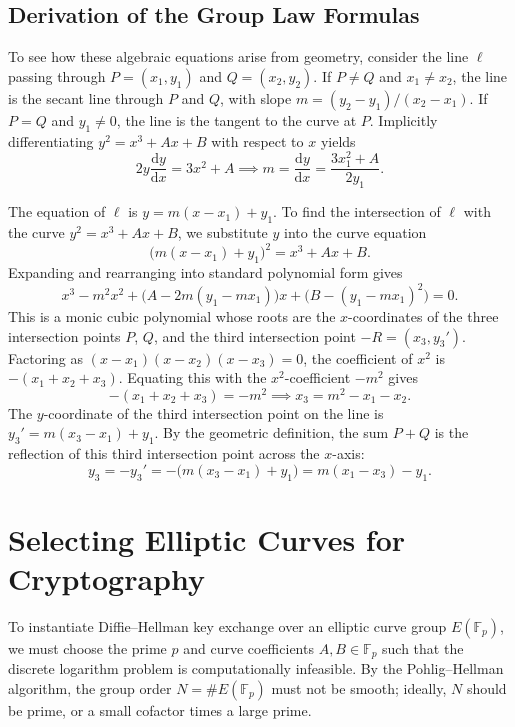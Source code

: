 \subsection*{Derivation of the Group Law Formulas}

To see how these algebraic equations arise from geometry, consider the line \(\ell\) passing through \(P = (x_1, y_1)\) and \(Q = (x_2, y_2)\).
If \(P \neq Q\) and \(x_1 \neq x_2\), the line is the secant line through \(P\) and \(Q\), with slope \(m = (y_2 - y_1) / (x_2 - x_1)\).
If \(P = Q\) and \(y_1 \neq 0\), the line is the tangent to the curve at \(P\).
Implicitly differentiating \(y^2 = x^3 + Ax + B\) with respect to \(x\) yields
\[
    2y \frac{\mathrm{d}y}{\mathrm{d}x} = 3x^2 + A \implies m = \frac{\mathrm{d}y}{\mathrm{d}x} = \frac{3x_1^2 + A}{2y_1}.
\]

The equation of \(\ell\) is \(y = m(x - x_1) + y_1\).
To find the intersection of \(\ell\) with the curve \(y^2 = x^3 + Ax + B\), we substitute \(y\) into the curve equation
\[
    \bigl(m(x - x_1) + y_1\bigr)^2 = x^3 + Ax + B.
\]
Expanding and rearranging into standard polynomial form gives
\[
    x^3 - m^2 x^2 + \bigl(A - 2m(y_1 - m x_1)\bigr)x + \bigl(B - (y_1 - m x_1)^2\bigr) = 0.
\]
This is a monic cubic polynomial whose roots are the \(x\)-coordinates of the three intersection points \(P\), \(Q\), and the third intersection point \(-R = (x_3, y_3')\).
Factoring as \((x - x_1)(x - x_2)(x - x_3) = 0\), the coefficient of \(x^2\) is \(-(x_1 + x_2 + x_3)\).
Equating this with the \(x^2\)-coefficient \(-m^2\) gives
\[
    -(x_1 + x_2 + x_3) = -m^2 \implies x_3 = m^2 - x_1 - x_2.
\]
The \(y\)-coordinate of the third intersection point on the line is \(y_3' = m(x_3 - x_1) + y_1\).
By the geometric definition, the sum \(P + Q\) is the reflection of this third intersection point across the \(x\)-axis:
\[
    y_3 = -y_3' = -\bigl(m(x_3 - x_1) + y_1\bigr) = m(x_1 - x_3) - y_1.
\]

\section*{Selecting Elliptic Curves for Cryptography}

To instantiate Diffie--Hellman key exchange over an elliptic curve group \(E(\mathbb{F}_p)\), we must choose the prime \(p\) and curve coefficients \(A, B \in \mathbb{F}_p\) such that the discrete logarithm problem is computationally infeasible.
By the Pohlig--Hellman algorithm, the group order \(N = \#E(\mathbb{F}_p)\) must not be smooth; ideally, \(N\) should be prime, or a small cofactor times a large prime.

